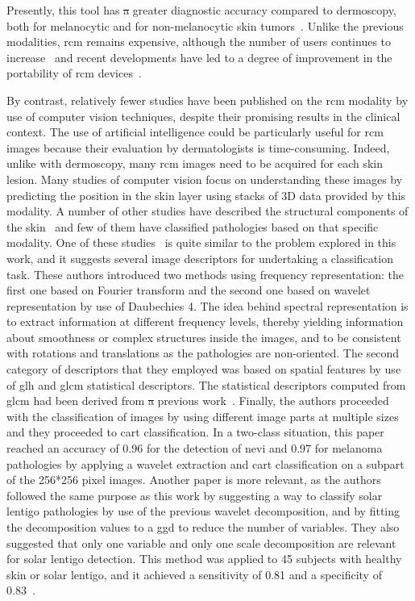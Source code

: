 \documentclass[journal,article,accept,moreauthors,pdftex, applsci]{Definitions/mdpi}
\providecommand{\DIFdel}[1]{{\protect\color{red}\sout{#1}}}                      %
\providecommand{\DIFdelbegin}{} %
\providecommand{\DIFdelend}{} %
\begin{document}
Presently, this tool has \DIFdelbegin \DIFdel{a }\DIFdelend greater diagnostic accuracy compared to dermoscopy, both for melanocytic and for non-melanocytic skin tumors~\cite{Haroon2017, Dinnes2018, Lupu2019}. Unlike the previous modalities, \ac{rcm} remains expensive, although the number of users continues to increase~\cite{Batta2015} and recent developments have led to a degree of improvement in the portability of \ac{rcm} devices~\cite{Freeman2018}.\par
By contrast, relatively fewer studies have been published on the \ac{rcm} modality by use of computer vision techniques, despite their promising results in the clinical context. The use of artificial intelligence could be particularly useful for \ac{rcm} images because their evaluation by dermatologists is time-consuming. Indeed, unlike with dermoscopy, many \ac{rcm} images need to be acquired for each skin lesion. Many studies of computer vision focus on understanding these images by predicting the position in the skin layer \cite{Somoza2014,Hames2016} using stacks of 3D data provided by this modality. A number of other studies have described the structural components of the skin~\cite{Gareau2010} and few of them have classified pathologies based on that specific modality. One of these studies~\cite{Wiltgen2008} is quite similar to the problem explored in this work, and it suggests several image descriptors for undertaking a classification task. These authors introduced two methods using frequency representation: the first one based on Fourier transform and the second one based on wavelet representation by use of Daubechies 4. The idea behind spectral representation is to extract information at different frequency levels, thereby yielding information about smoothness or complex structures inside the images, and to be consistent with rotations and translations as the pathologies are non-oriented. The second category of descriptors that they employed was based on spatial features by use of \ac{glh} and \ac{glcm} statistical descriptors. The statistical descriptors computed from \ac{glcm} had been derived from \DIFdelbegin \DIFdel{a }\DIFdelend previous work~\cite{Haralick1973}. Finally, the authors proceeded with the classification of images by using different image parts at multiple sizes and they proceeded to \ac{cart} classification. In a two-class situation, this paper reached an accuracy of 0.96 for the detection of nevi and 0.97 for melanoma pathologies by applying a wavelet extraction and \ac{cart} classification on a subpart of the 256*256 pixel images. Another paper is more relevant, as the authors followed the same purpose as this work by suggesting a way to classify solar lentigo pathologies by use of the previous wavelet decomposition, and by fitting the decomposition values to a \ac{ggd} to reduce the number of variables. They also suggested that only one variable and only one scale decomposition are relevant for solar lentigo detection. This method was applied to 45 subjects with healthy skin or solar lentigo, and it achieved a sensitivity of 0.81 and a specificity of 0.83~\cite{Halimi2017a}.\par
\end{document}

